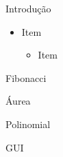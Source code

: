 

\begin{frame}[t,plain]
\titlepage
\end{frame}

\begin{frame}[t]{Introdução}
\begin{itemize}
\item Item
\begin{itemize}
	\item Item
\end{itemize}
\end{itemize}
\end{frame}


%
\begin{frame}[t]{Fibonacci}
	
\end{frame}

%
\begin{frame}[t]{Áurea}
	
\end{frame}

%
\begin{frame}[t]{Polinomial}
	
\end{frame}

%
\begin{frame}[t]{GUI}
	
\end{frame}